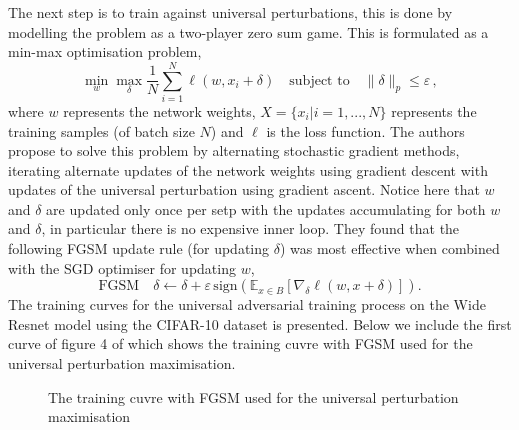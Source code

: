 The next step is to train against universal perturbations, this is done by modelling the problem as a two-player zero sum game. This is formulated as a min-max optimisation problem, $$ \min_w \max_{\delta} \frac1N \sum_{i = 1}^N \ell(w, x_i + \delta) \quad \text{subject to} \quad \| \delta \|_p \leq \varepsilon \, ,$$ where $w$ represents the network weights, $X=\{x_i|i =1,...,N \}$ represents the training samples (of batch size $N$) and $\ell$ is the loss function. The authors propose to solve this problem by alternating stochastic gradient methods, iterating alternate updates of the network weights using gradient descent with updates of the universal perturbation using gradient ascent. Notice here that $w$ and $\delta$ are updated only once per setp with the updates accumulating for both $w$ and $\delta$, in particular there is no expensive inner loop. They found that the following FGSM update rule (for updating $\delta$) was most effective when combined with the SGD optimiser for updating $w$,
$$\text{FGSM} \quad \delta \leftarrow \delta + \varepsilon \, \text{sign}(\mathbb{E}_{x \in B}[\nabla_{\delta} \ell(w, x + \delta)]).$$ 
The training curves for the universal adversarial training process on the Wide Resnet model using the CIFAR-10 dataset is presented. Below we include the first curve of figure 4 of \cite{shafahi_universal_2018} which shows the training cuvre with FGSM used for the universal perturbation maximisation.
\begin{figure}[b] 
\caption{The training cuvre with FGSM used for the universal perturbation maximisation}
\centering
\end{figure}
